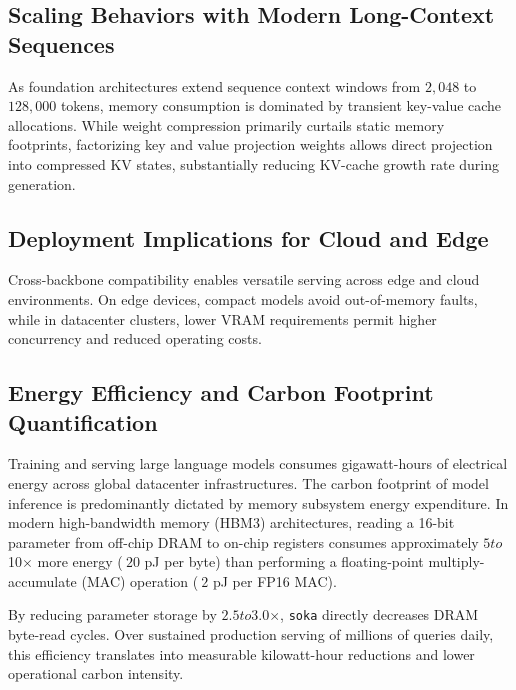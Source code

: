 \subsection{Scaling Behaviors with Modern Long-Context Sequences}
As foundation architectures extend sequence context windows from $2{,}048$ to $128{,}000$ tokens, memory consumption is dominated by transient key-value cache allocations. While weight compression primarily curtails static memory footprints, factorizing key and value projection weights allows direct projection into compressed KV states, substantially reducing KV-cache growth rate during generation.

\subsection{Deployment Implications for Cloud and Edge}
Cross-backbone compatibility enables versatile serving across edge and cloud environments. On edge devices, compact models avoid out-of-memory faults, while in datacenter clusters, lower VRAM requirements permit higher concurrency and reduced operating costs.

\subsection{Energy Efficiency and Carbon Footprint Quantification}
Training and serving large language models consumes gigawatt-hours of electrical energy across global datacenter infrastructures. The carbon footprint of model inference is predominantly dictated by memory subsystem energy expenditure. In modern high-bandwidth memory (HBM3) architectures, reading a 16-bit parameter from off-chip DRAM to on-chip registers consumes approximately $5$\times$ to $10$\times$ more energy ($~20$ pJ per byte) than performing a floating-point multiply-accumulate (MAC) operation ($~2$ pJ per FP16 MAC).

By reducing parameter storage by $2.5$\times$ to $3.0$\times$, \texttt{soka} directly decreases DRAM byte-read cycles. Over sustained production serving of millions of queries daily, this efficiency translates into measurable kilowatt-hour reductions and lower operational carbon intensity.
